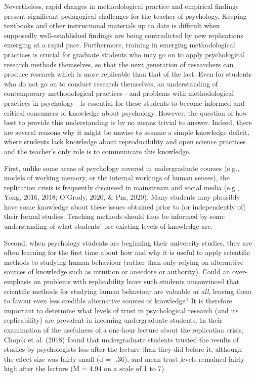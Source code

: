 \documentclass[
  man,mask,floatsintext]{apa6}
\begin{document}
Nevertheless, rapid changes in methodological practice and empirical findings present significant pedagogical challenges for the teacher of psychology. Keeping textbooks and other instructional materials up to date is difficult when supposedly well-established findings are being contradicted by new replications emerging at a rapid pace. Furthermore, training in emerging methodological practices is crucial for graduate students who may go on to apply psychological research methods themselves, so that the next generation of researchers can produce research which is more replicable than that of the last. Even for students who do not go on to conduct research themselves, an understanding of contemporary methodological practices - and problems with methodological practices in psychology - is essential for these students to become informed and critical consumers of knowledge about psychology. However, the question of how best to provide this understanding is by no means trivial to answer. Indeed, there are several reasons why it might be unwise to assume a simple knowledge deficit, where students lack knowledge about reproducibility and open science practices and the teacher's only role is to communicate this knowledge.

First, unlike some areas of psychology covered in undergraduate courses (e.g., models of working memory, or the internal workings of human senses), the replication crisis is frequently discussed in mainstream and social media (e.g., Yong, 2016, 2018; O'Grady, 2020, \& Pm, 2020). Many students may plausibly have some knowledge about these issues obtained prior to (or independently of) their formal studies. Teaching methods should thus be informed by some understanding of what students' pre-existing levels of knowledge are.

Second, when psychology students are beginning their university studies, they are often learning for the first time about how and why it is useful to apply scientific methods to studying human behaviour (rather than only relying on alternative sources of knowledge such as intuition or anecdote or authority). Could an over-emphasis on problems with replicability leave such students unconvinced that scientific methods for studying human behaviour are valuable \emph{at all}, leaving them to favour even less credible alternative sources of knowledge? It is therefore important to determine what levels of trust in psychological research (and its replicability) are prevalent in incoming undergraduate students. In their examination of the usefulness of a one-hour lecture about the replication crisis, Chopik et al. (2018) found that undergraduate students trusted the results of studies by psychologists less after the lecture than they did before it, although the effect size was fairly small (d = -.36), and mean trust levels remained fairly high after the lecture (M = 4.94 on a scale of 1 to 7).
\end{document}
